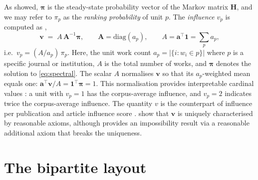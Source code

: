 As \textcite{gellerCitationInfluenceMethodology1978} showed, $\boldsymbol{\pi}$ is the steady-state probability vector of the Markov matrix $\mathbf{H}$, and we may refer to $\pi_p$ as the \emph{ranking probability} of unit $p$.
The \emph{influence} $v_p$ is computed as \citep{palacios-huertaMeasurementIntellectualInfluence2004},
\begin{equation}
	\mathbf{v}
	\;=\;
	A\,\mathbf{A}^{-1}\boldsymbol{\pi},
	\qquad
	\mathbf{A}=\mathrm{diag}(a_p),
	\qquad
	A = \mathbf{a}^{\top}\mathbf{1} = \textstyle\sum_p a_p,
	\label{eq:vstar}
\end{equation}
i.e.\ $v_p = (A/a_p)\,\pi_p$. 
Here, the unit work count $a_p = |\{i:w_i\in p\}|$ where $p$ is a specific journal or institution, $A$ is the total number of works, and $\boldsymbol{\pi}$ denotes the solution to \eqref{eq:spectral}.
The scalar $A$ normalises $\mathbf{v}$ so that its $a_p$-weighted mean equals one:
$\mathbf{a}^{\top}\mathbf{v}/A=\mathbf{1}^{\top}\boldsymbol{\pi}=1$.
This normalisation provides interpretable cardinal values \citep{stevensTheoryScalesMeasurement1946}: a unit with $v_p=1$ has the corpus-average influence, and
$v_p=2$ indicates twice the corpus-average influence.  The quantity $v$ is the counterpart of influence per publication \citep{pinskiCitationInfluenceJournal1976} and article influence score 
\citep{bergstromEigenfactorMetrics2008}.
\textcite{palacios-huertaMeasurementIntellectualInfluence2004} show that
$\mathbf{v}$ is uniquely characterised by reasonable axioms, although \textcite{serranoMeasurementIntellectualInfluence2004} provides an impossibility result via a reasonable additional axiom that breaks the uniqueness.

\section{The bipartite layout}
\label{sec:bipartite}


